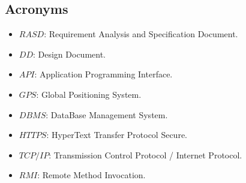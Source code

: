 \subsection{Acronyms}

\begin{itemize}
	\item $RASD$: Requirement Analysis and Specification Document.
	\item $DD$: Design Document.
	\item $API$: Application Programming Interface.
	\item $GPS$: Global Positioning System.
	\item $DBMS$: DataBase Management System.
	\item $HTTPS$: HyperText Transfer Protocol Secure.
	\item $TCP/IP$: Transmission Control Protocol / Internet Protocol.
	\item $RMI$: Remote Method Invocation.

\end{itemize}
 